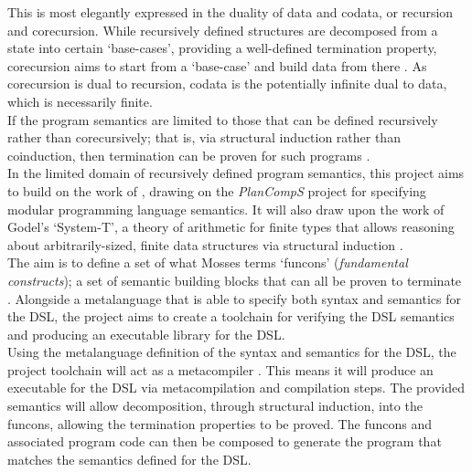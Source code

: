 This is most elegantly expressed in the duality of data and codata, or recursion and corecursion. 
While recursively defined structures are decomposed from a state into certain `base-cases', providing a well-defined termination property, corecursion aims to start from a `base-case' and build data from there \citep{hinze2010reasoning}.
As corecursion is dual to recursion, codata is the potentially infinite dual to data, which is necessarily finite. \\

If the program semantics are limited to those that can be defined recursively rather than corecursively; that is, via structural induction rather than coinduction, then termination can be proven for such programs \citep{nordstrom1988terminating}.\\

In the limited domain of recursively defined program semantics, this project aims to build on the work of \cite{doh2001composing}, drawing on the \textit{PlanCompS} project for specifying modular programming language semantics.
It will also draw upon the work of Godel's `System-T', a theory of arithmetic for finite types that allows reasoning about arbitrarily-sized, finite data structures via structural induction \cite{girard1989proofs,alves2010godel}.\\

The aim is to define a set of what Mosses terms `funcons' (\textit{fundamental constructs}); a set of semantic building blocks that can all be proven to terminate \cite{Churchill:2014:RCS:2577080.2577099}.
Alongside a metalanguage that is able to specify both syntax and semantics for the DSL, the project aims to create a toolchain for verifying the DSL semantics and producing an executable library for the DSL.\\

Using the metalanguage definition of the syntax and semantics for the DSL, the project toolchain will act as a metacompiler \cite{Mandell:1966:MDA:800267.810785}.
This means it will produce an executable for the DSL via metacompilation and compilation steps.
The provided semantics will allow decomposition, through structural induction, into the funcons, allowing the termination properties to be proved.
The funcons and associated program code can then be composed to generate the program that matches the semantics defined for the DSL.\\


